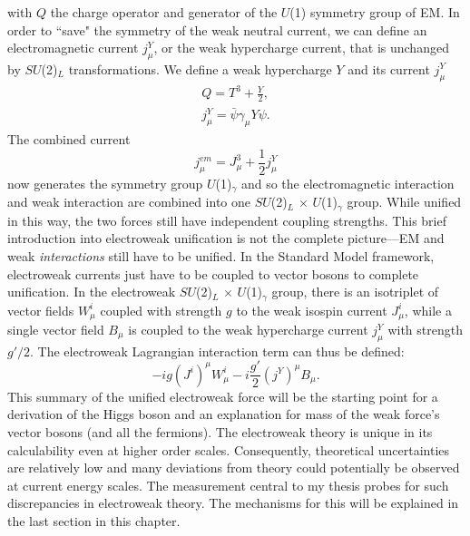 with $Q$ the charge operator and generator of the $U$(1) symmetry group of EM. In order to ``save" the symmetry of the weak neutral current, we can define an electromagnetic current $j_\mu^Y$, or the weak hypercharge current, that is unchanged by $SU$(2)$_L$ transformations. We define a weak hypercharge $Y$ and its current $j_\mu^Y$
\begin{equation}
\begin{split}
Q=T^3+\frac{Y}{2}, \\
j_\mu^Y =\bar{\psi}\gamma_\mu Y \psi.
\end{split}
\end{equation}
The combined current 
\begin{equation}
j_\mu^{em} = J_\mu^3+\frac{1}{2}j_\mu^Y
\end{equation}
now generates the symmetry group $U$(1)$_\gamma$ and so the electromagnetic interaction and weak interaction are combined into one $SU$(2)$_L$ $\times$ $U$(1)$_\gamma$ group. While unified in this way, the two forces still have independent coupling strengths. This brief introduction into electroweak unification is not the complete picture---EM and weak \textit{interactions} still have to be unified. In the Standard Model framework, electroweak currents just have to be coupled to vector bosons to complete unification. In the electroweak $SU$(2)$_L$ $\times$ $U$(1)$_\gamma$ group, there is an isotriplet of vector fields $W_\mu^i$ coupled with strength $g$ to the weak isospin current $J_\mu^i$, while a single vector field $B_\mu$ is coupled to the weak hypercharge current $j_\mu^Y$ with strength $g'/2$. The electroweak Lagrangian interaction term can thus be defined:
\begin{equation}
-i g (J^i)^\mu W_\mu^i-i\frac{g'}{2}(j^Y)^\mu B_\mu .
\end{equation}
This summary of the unified electroweak force will be the starting point for a derivation of the Higgs boson and an explanation for mass of the weak force's vector bosons (and all the fermions). The electroweak theory is unique in its calculability even at higher order scales. Consequently, theoretical uncertainties are relatively low and many deviations from theory could potentially be observed at current energy scales. The measurement central to my thesis probes for such discrepancies in electroweak theory. The mechanisms for this will be explained in the last section in this chapter. 

